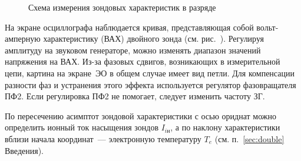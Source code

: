 \begin{figure}[h!]
    \centering
    \caption{Схема измерения зондовых характеристик в разряде}
\end{figure}

На экране осциллографа наблюдается кривая, представляющая собой вольт-амперную
характеристику (ВАХ) двойного зонда (см. рис.~).
Регулируя амплитуду на звуковом генераторе, можно изменять диапазон значений
напряжения  на ВАХ. Из-за фазовых сдвигов, возникающих в измерительной цепи, 
картина на экране~ЭО в общем случае имеет вид петли.
Для компенсации разности фаз и устранения этого эффекта 
используется регулятор фазовращателя ПФ2. Если регулировка ПФ2 не помогает,
следует изменить частоту ЗГ.

По пересечению асимптот зондовой характеристики с осью ориднат
можно определить ионный ток насыщения зондов $I_{iн}$, а по наклону 
характеристики вблизи начала координат~--- электронную температуру $T_e$
(см. п.~\ref{sec:double} Введения).





